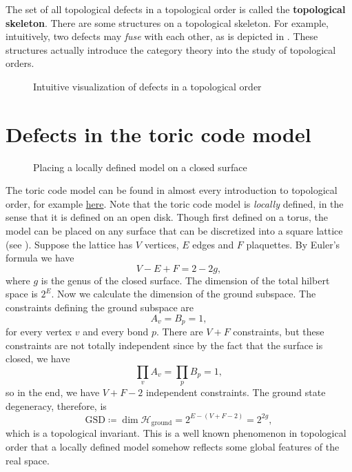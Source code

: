 \documentclass[hyperref, a4paper]{article}
\newcommand*{\concept}[1]{{\textbf{#1}}}
\begin{document}
The set of all topological defects in a topological order is called the \concept{topological skeleton}. 
There are some structures on a topological skeleton. For example, intuitively, two defects may \emph{fuse} with each other, as is depicted in .
These structures actually introduce the category theory into the study of topological orders.

\begin{figure}
    \centering
    
    \caption{Intuitive visualization of defects in a topological order}
    \label{fig:fusion-example}
\end{figure}

\section{Defects in the toric code model}

\begin{figure}
    \centering
    
    \caption{Placing a locally defined model on a closed surface}
    \label{fig:local-model-manifold}
\end{figure}

The toric code model can be found in almost every introduction to topological order, for example \href{./2021-10-15}{here}.
Note that the toric code model is \emph{locally} defined, in the sense that it is defined on an open disk.
Though first defined on a torus, the model can be placed on any surface that can be discretized into a square lattice (see ).
Suppose the lattice has $V$ vertices, $E$ edges and $F$ plaquettes.
By Euler's formula we have 
\begin{equation}
    V - E + F = 2 - 2g,
\end{equation}
where $g$ is the genus of the closed surface.
The dimension of the total hilbert space is $2^E$. Now we calculate the dimension of the ground subspace.
The constraints defining the ground subspace are 
\begin{equation}
    A_v = B_p = 1,
\end{equation}
for every vertex $v$ and every bond $p$. There are $V+F$ constraints, but these constraints are not totally independent since by the fact that the surface is closed, we have 
\begin{equation}
    \prod_v A_v = \prod_p B_p = 1,
\end{equation}
so in the end, we have $V+F-2$ independent constraints.
The ground state degeneracy, therefore, is 
\begin{equation}
    \mathrm{GSD} \coloneqq \dim \mathcal{H}_\text{ground} = 2^{E - (V+F-2)} = 2^{2g},
\end{equation}
which is a topological invariant. This is a well known phenomenon in topological order that a locally defined model somehow reflects some global features of the real space.
\end{document}
